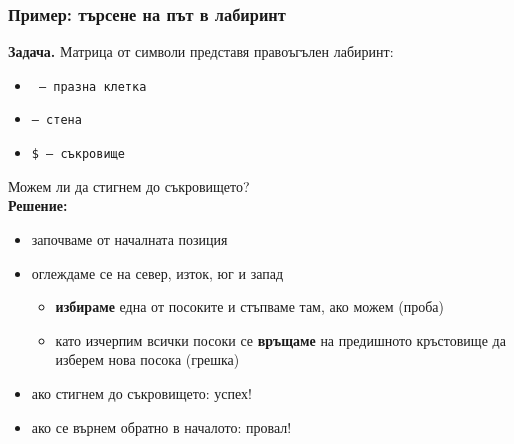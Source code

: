 \documentclass[alsotrans]{beamerswitch}
\begin{document}
\begin{frame}
  \frametitle{Пример: търсене на път в лабиринт}

  \textbf{Задача.} Матрица от символи представя правоъгълен лабиринт:
  \begin{itemize}
  \item \tt\textvisiblespace\ --- празна клетка
  \item \tt* --- стена
  \item \tt\$ --- съкровище
  \end{itemize}
  Можем ли да стигнем до съкровището?\\[0.5em]
  \pause
  \textbf{Решение:}
  \begin{itemize}[<+->]
  \item започваме от началната позиция
  \item оглеждаме се на север, изток, юг и запад
    \begin{itemize}
    \item \textbf{избираме} една от посоките и стъпваме там, ако можем \alert{(проба)}
    \item като изчерпим всички посоки се \textbf{връщаме} на предишното кръстовище да изберем нова посока \alert{(грешка)}
    \end{itemize}
  \item ако стигнем до съкровището: \alert{успех!}
  \item ако се върнем обратно в началото: \alert{провал!}
  \end{itemize}
\end{frame}
\end{document}

